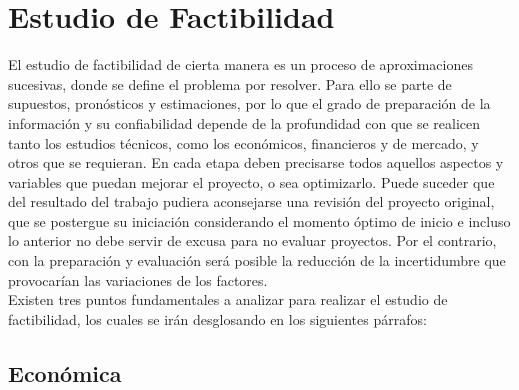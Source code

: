 \section{Estudio de Factibilidad}

El estudio de factibilidad de cierta manera es un proceso de aproximaciones sucesivas, donde se define el problema por resolver. Para ello se parte de supuestos, pronósticos y estimaciones, por lo que el grado de preparación de la información y su confiabilidad depende de la profundidad con que se realicen tanto los estudios técnicos, como los económicos, financieros y de mercado, y otros que se requieran. En cada etapa deben precisarse todos aquellos aspectos y variables que puedan mejorar el proyecto, o sea optimizarlo. Puede suceder que del resultado del trabajo pudiera aconsejarse una revisión del proyecto original, que se postergue su iniciación considerando el momento óptimo de inicio e incluso lo anterior no debe servir de excusa para no evaluar proyectos. Por el contrario, con la preparación y evaluación será posible la reducción de la incertidumbre que provocarían las variaciones de los factores. \cite{16} \\

Existen tres puntos fundamentales a analizar para realizar el estudio de factibilidad, los cuales se irán desglosando en los siguientes párrafos:

\subsection{Económica}

